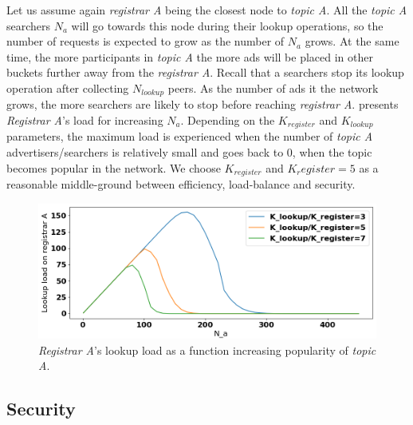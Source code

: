 Let us assume again \emph{registrar A} being the closest node to \emph{topic A}. All the \emph{topic A} searchers $N_a$ will go towards this node during their lookup operations, so the number of requests is expected to grow as the number of $N_a$ grows. At the same time, the more participants in \emph{topic A} the more ads will be placed in other buckets further away from the \emph{registrar A}. Recall that a searchers stop its lookup operation after collecting $N_{lookup}$ peers. As the number of ads it the network grows, the more searchers are likely to stop before reaching \emph{registrar A}.  presents \emph{Registrar A}'s load for increasing $N_a$. Depending on the $K_{register}$ and $K_{lookup}$ parameters, the maximum load is experienced when the number of \emph{topic A} advertisers/searchers is relatively small and goes back to $0$, when the topic becomes popular in the network. We choose $K_{register}$ and $K_register =5$ as a reasonable middle-ground between efficiency, load-balance and security.

\begin{figure}[t]
    \includegraphics[width=1\linewidth]{img/fairness_lookup}
    \caption{\emph{Registrar A}'s lookup load as a function increasing popularity of \emph{topic A}.
    }
    \label{fig:fairness_lookup}
\end{figure}

\subsection{Security}

